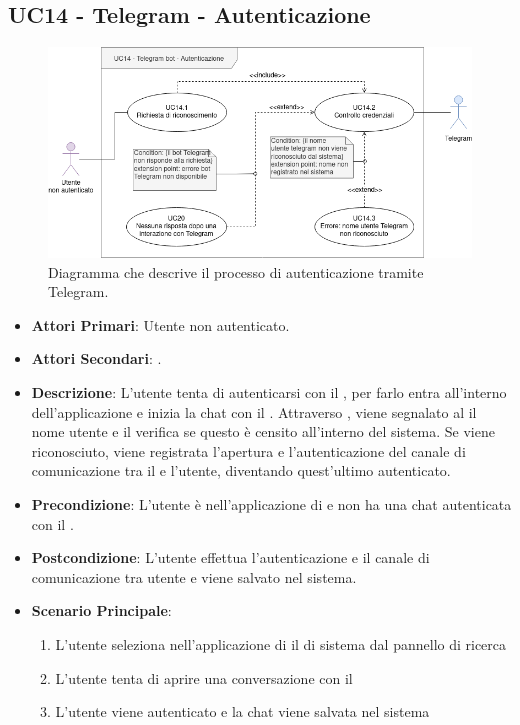 \subsection{UC14 - Telegram - Autenticazione}
		
	\begin{figure}[H]
		\centering
		\includegraphics[scale=0.60]{res/images/uc14}
		\caption{Diagramma che descrive il processo di autenticazione tramite Telegram.}
	\end{figure}
		
	\begin{itemize}
		\item \textbf{Attori Primari}: Utente non autenticato.
		\item \textbf{Attori Secondari}: .
		\item \textbf{Descrizione}: L'utente tenta di autenticarsi con il  , per farlo entra all'interno dell'applicazione e inizia la chat con il . Attraverso , viene segnalato al  il nome utente e il  verifica se questo è censito all'interno del sistema. Se viene riconosciuto, viene registrata l'apertura e l'autenticazione del canale di comunicazione tra il  e l'utente, diventando quest'ultimo autenticato. 
		\item \textbf{Precondizione}: L'utente è nell'applicazione di  e non ha una chat autenticata con il .
		\item \textbf{Postcondizione}: L'utente effettua l'autenticazione e il canale di comunicazione tra utente e  viene salvato nel sistema.
		\item \textbf{Scenario Principale}:
		\begin{enumerate}
			\item L'utente seleziona nell'applicazione di  il  di sistema dal pannello di ricerca
			\item L'utente tenta di aprire una conversazione con il 
			\item L'utente viene autenticato e la chat viene salvata nel sistema
		\end{enumerate}
	\end{itemize}
	
